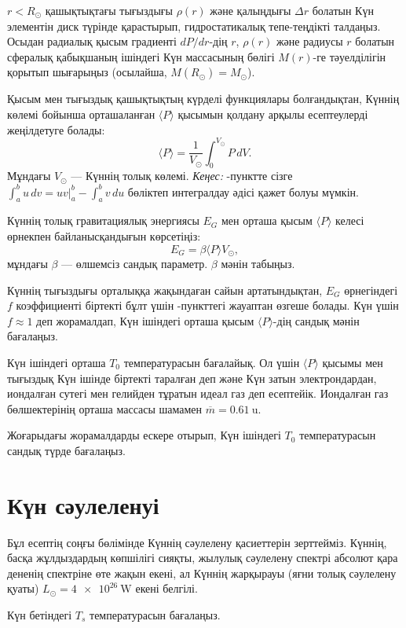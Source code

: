 \begin{task}
\item $r<R_\odot$ қашықтықтағы тығыздығы $\rho(r)$ және қалыңдығы $\Delta r$ болатын Күн элементін диск түрінде қарастырып, гидростатикалық тепе-теңдікті талдаңыз. Осыдан радиалық қысым градиенті $dP/dr$-дің $r$, $\rho(r)$ және радиусы $r$ болатын сфералық қабықшаның ішіндегі Күн массасының бөлігі $M(r)$-ге тәуелділігін қорытып шығарыңыз (осылайша, $M(R_\odot)=M_\odot$).
\end{task}
Қысым мен тығыздық қашықтықтың күрделі функциялары болғандықтан, Күннің көлемі бойынша орташаланған $\langle P\rangle$ қысымын қолдану арқылы есептеулерді жеңілдетуге болады:
$$
\langle P\rangle = \frac1{V_\odot} \int_0^{V_{\odot}} P\, dV.
$$
Мұндағы $V_\odot$ --- Күннің толық көлемі. \textit{Кеңес:} -пунктте сізге $\int_a^b u\,dv= uv|_a^b-\int_a^b v\,du$ бөліктеп интегралдау әдісі қажет болуы мүмкін.
\begin{task}
\item Күннің толық гравитациялық энергиясы $E_G$ мен орташа қысым $\langle P\rangle$ келесі өрнекпен байланысқандығын көрсетіңіз:
$$
E_G = \beta\langle P\rangle V_\odot,
$$
мұндағы $\beta$ --- өлшемсіз сандық параметр. $\beta$ мәнін табыңыз.
\item Күннің тығыздығы орталыққа жақындаған сайын артатындықтан, $E_G$ өрнегіндегі $f$ коэффициенті біртекті бұлт үшін -пункттегі жауаптан өзгеше болады. Күн үшін $f\approx1$ деп жорамалдап, Күн ішіндегі орташа қысым $\langle P\rangle$-дің сандық мәнін бағалаңыз.
\end{task}
Күн ішіндегі орташа $T_0$ температурасын бағалайық. Ол үшін $\langle P\rangle$ қысымы мен тығыздық Күн ішінде біртекті таралған деп және Күн затын электрондардан, иондалған сутегі мен гелийден тұратын идеал газ деп есептейік. Иондалған газ бөлшектерінің орташа массасы шамамен $\overline m=\qty{0.61}{\amu}$.
\begin{task}
\item Жоғарыдағы жорамалдарды ескере отырып, Күн ішіндегі $T_0$ температурасын сандық түрде бағалаңыз.
\end{task}

\part{Күн сәулеленуі}

Бұл есептің соңғы бөлімінде Күннің сәулелену қасиеттерін зерттейміз. Күннің, басқа жұлдыздардың көпшілігі сияқты, жылулық сәулелену спектрі абсолют қара дененің спектріне өте жақын екені, ал Күннің жарқырауы (яғни толық сәулелену қуаты) $L_\odot=\qty{4e26}{\W}$ екені белгілі.
\begin{task}
\item Күн бетіндегі $T_s$ температурасын бағалаңыз.
\end{task}

